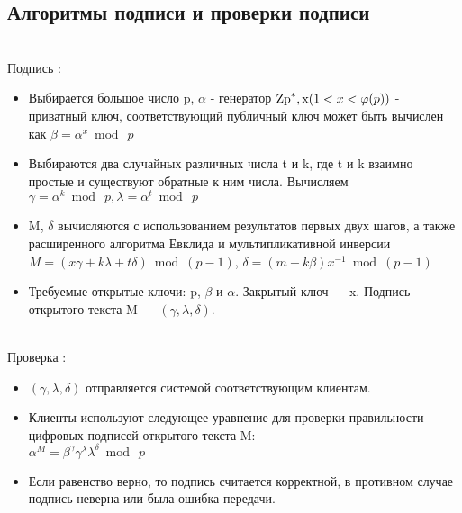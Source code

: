 \documentclass[a4paper]{article}
\begin{document}
\subsection*{Алгоритмы подписи и проверки подписи}\\
\caption{Подпись :}
\begin{itemize}
    \item Выбирается большое число p, $\alpha$ - генератор ${\rm Zp}^{\ast}, {\rm x}(1 < x < \varphi(p))$ - приватный ключ, соответствующий публичный ключ может быть вычислен как $\beta=\alpha^{x}\bmod\ p$
    \item Выбираются два случайных различных числа t и k, где t и k взаимно простые и существуют обратные к ним числа. Вычисляем $\gamma=\alpha^{k}\bmod\ p, \lambda=\alpha^{t}\bmod\ p$
    \item M, $\delta$ вычисляются с использованием результатов первых двух шагов, а также расширенного алгоритма Евклида и мультипликативной инверсии $M=(x\gamma+k\lambda+t\delta)\bmod(p-1)$, 
    $\delta=(m-k\beta)x^{-1}\bmod(p-1)$
    \item Требуемые открытые ключи: p, $\beta$ и $\alpha$. Закрытый ключ — x. Подпись открытого текста M — $(\gamma, \lambda, \delta)$.
\end{itemize}
\\
\caption{Проверка :}
\begin{itemize}
    \item $(\gamma, \lambda, \delta)$ отправляется системой соответствующим клиентам.
    \item Клиенты используют следующее уравнение для проверки правильности цифровых подписей открытого текста M:\\
    $\alpha^{M}=\beta^{\gamma}\gamma^{\lambda}\lambda^{\delta}\bmod\ p$
    \item Если равенство верно, то подпись считается корректной, в противном случае подпись неверна или была ошибка передачи. 
\end{itemize}
    
\end{document}
